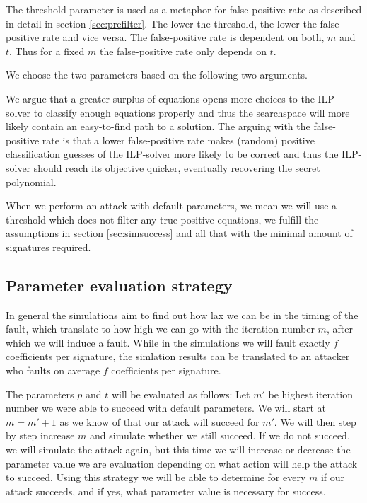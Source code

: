 \documentclass[a4paper,titlepage]{article}
\begin{document}
The threshold parameter is used as a metaphor for false-positive rate as described in detail in section \ref{sec:prefilter}. The lower the threshold, the lower the false-positive rate and vice versa.
The false-positive rate is dependent on both, $m$ and $t$. Thus for a fixed $m$ the false-positive rate only depends on $t$.

We choose the two parameters based on the following two arguments.

We argue that a greater surplus of equations opens more choices to the ILP-solver to classify enough equations properly and thus the searchspace will more likely contain an easy-to-find path to a solution.
The arguing with the false-positive rate is that a lower false-positive rate makes (random) positive classification guesses of the ILP-solver more likely to be correct and thus the ILP-solver should reach its objective quicker, eventually recovering the secret polynomial.


When we perform an attack with default parameters, we mean we will use a threshold which does not filter any true-positive equations, we fulfill the assumptions in section \ref{sec:simsuccess} and all that with the minimal amount of signatures required.

\subsection{Parameter evaluation strategy}
In general the simulations aim to find out how lax we can be in the timing of the fault, which translate to how high we can go with the iteration number $m$, after which we will induce a fault. While in the simulations we will fault exactly $f$ coefficients per signature, the simlation results can be translated to an attacker who faults on average $f$ coefficients per signature.

The parameters $p$ and $t$ will be evaluated as follows:
Let $m'$ be highest iteration number we were able to succeed with default parameters.
We will start at $m = m' + 1$ as we know of that our attack will succeed for $m'$.
We will then step by step increase $m$ and simulate whether we still succeed. If we do not succeed, we will simulate the attack again, but this time we will increase or decrease the parameter value we are evaluation depending on what action will help the attack to succeed.
Using this strategy we will be able to determine for every $m$ if our attack succeeds, and if yes, what parameter value is necessary for success.
\end{document}

